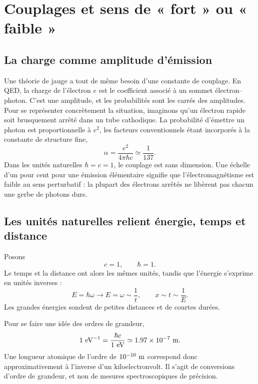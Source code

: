 \section{Couplages et sens de « fort » ou « faible »}

\subsection{La charge comme amplitude d’émission}

Une théorie de jauge a tout de même besoin d’une constante de couplage. En QED, la charge de l’électron \(e\) est le coefficient associé à un sommet électron--photon. C’est une amplitude, et les probabilités sont les carrés des amplitudes. Pour se représenter concrètement la situation, imaginons qu’un électron rapide soit brusquement arrêté dans un tube cathodique. La probabilité d’émettre un photon est proportionnelle à \(e^2\), les facteurs conventionnels étant incorporés à la constante de structure fine,
\begin{equation}
\alpha=\frac{e^2}{4\pi\hbar c}
\simeq \frac{1}{137}.
\label{eq:l5-alpha}
\end{equation}
Dans les unités naturelles \(\hbar=c=1\), le couplage est sans dimension. Une échelle d’un pour cent pour une émission élémentaire signifie que l’électromagnétisme est faible au sens perturbatif : la plupart des électrons arrêtés ne libèrent pas chacun une gerbe de photons durs.

\subsection{Les unités naturelles relient énergie, temps et distance}

Posons
\begin{equation}
c=1,
\qquad
\hbar=1.
\end{equation}
Le temps et la distance ont alors les mêmes unités, tandis que l’énergie s’exprime en unités inverses :
\begin{equation}
E=\hbar\omega\longrightarrow E=\omega\sim\frac1t,
\qquad
x\sim t\sim\frac1E.
\end{equation}
Les grandes énergies sondent de petites distances et de courtes durées.

Pour se faire une idée des ordres de grandeur,
\begin{equation}
1\ {\rm eV}^{-1}
=\frac{\hbar c}{1\ {\rm eV}}
\simeq 1.97\times10^{-7}\ {\rm m}.
\end{equation}
Une longueur atomique de l’ordre de \(10^{-10}\ {\rm m}\) correspond donc approximativement à l’inverse d’un kiloelectronvolt. Il s’agit de conversions d’ordre de grandeur, et non de mesures spectroscopiques de précision.

